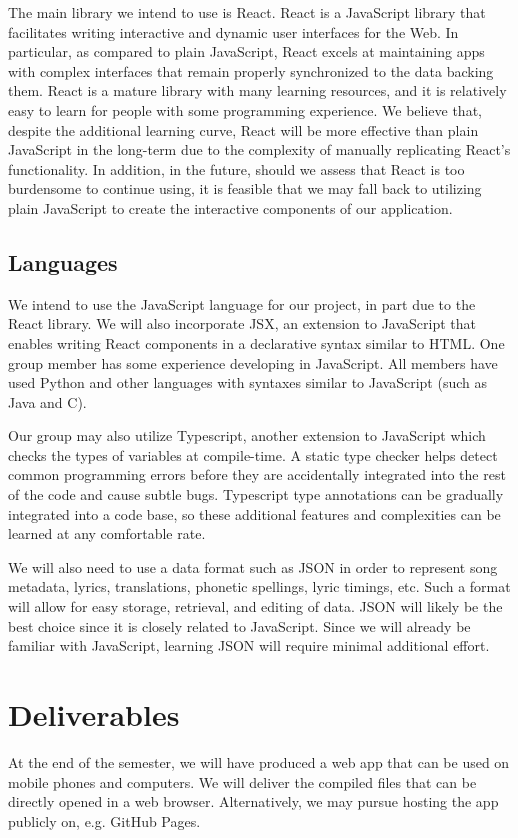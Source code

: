 \documentclass[conference, 12pt]{IEEEtran}
\begin{document}
The main library we intend to use is React. 
React is a JavaScript library that facilitates writing interactive and dynamic user interfaces for the Web.
In particular, as compared to plain JavaScript, React excels at maintaining apps with complex interfaces that remain properly synchronized to the data backing them.
React is a mature library with many learning resources, and it is relatively easy to learn for people with some programming experience. 
We believe that, despite the additional learning curve, React will be more effective than plain JavaScript in the long-term due to the complexity of manually replicating React's functionality.
In addition, in the future, should we assess that React is too burdensome to continue using, it is feasible that we may fall back to utilizing plain JavaScript to create the interactive components of our application.

\subsection{Languages}
We intend to use the JavaScript language for our project, in part due to the React library.
We will also incorporate JSX, an extension to JavaScript that enables writing React components in a declarative syntax similar to HTML. 
One group member has some experience developing in JavaScript. 
All members have used Python and other languages with syntaxes similar to JavaScript (such as Java and C).

Our group may also utilize Typescript, another extension to JavaScript which checks the types of variables at compile-time.
A static type checker helps detect common programming errors before they are accidentally integrated into the rest of the code and cause subtle bugs.
Typescript type annotations can be gradually integrated into a code base, so these additional features and complexities can be learned at any comfortable rate.

We will also need to use a data format such as JSON in order to represent song metadata, lyrics, translations, phonetic spellings, lyric timings, etc.
Such a format will allow for easy storage, retrieval, and editing of data.
JSON will likely be the best choice since it is closely related to JavaScript.
Since we will already be familiar with JavaScript, learning JSON will require minimal additional effort.

\section{Deliverables}
At the end of the semester, we will have produced a web app that can be used on mobile phones and computers. 
We will deliver the compiled files that can be directly opened in a web browser.
Alternatively, we may pursue hosting the app publicly on, e.g. GitHub Pages.
\end{document}
